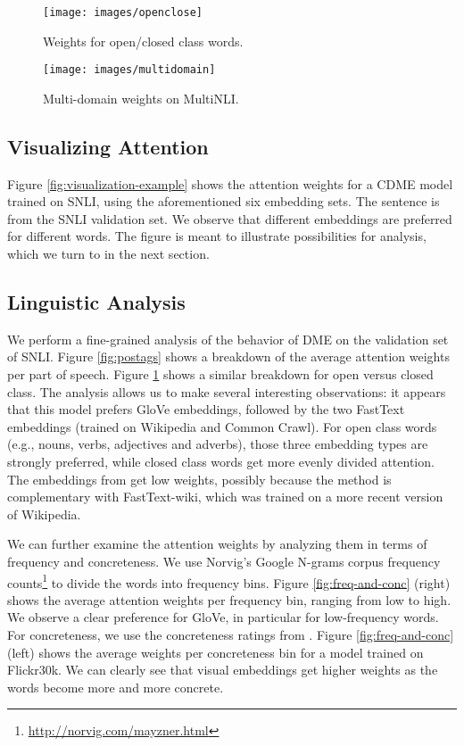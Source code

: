 \documentclass[11pt,a4paper]{article}
\begin{document}
\begin{figure}[t]
\centering
\texttt{[image: images/openclose]}
\caption{Weights for open/closed class words.}
\label{fig:openclose}
\end{figure}

\begin{figure}[t]
\centering
\texttt{[image: images/multidomain]}
\caption{Multi-domain weights on MultiNLI.}
\label{fig:multidomain}
\end{figure}

\subsection{Visualizing Attention}

Figure \ref{fig:visualization-example} shows the attention weights for a CDME model trained on SNLI, using the aforementioned six embedding sets. The sentence is from the SNLI validation set. We observe that different embeddings are preferred for different words. The figure is meant to illustrate possibilities for analysis, which we turn to in the next section.

\subsection{Linguistic Analysis}

We perform a fine-grained analysis of the behavior of DME on the validation set of SNLI. Figure \ref{fig:postags} shows a breakdown of the average attention weights per part of speech. Figure \ref{fig:openclose} shows a similar breakdown for open versus closed class. The analysis allows us to make several interesting observations: it appears that this model prefers GloVe embeddings, followed by the two FastText embeddings (trained on Wikipedia and Common Crawl). For open class words (e.g., nouns, verbs, adjectives and adverbs), those three embedding types are strongly preferred, while closed class words get more evenly divided attention. The embeddings from  get low weights, possibly because the method is complementary with FastText-wiki, which was trained on a more recent version of Wikipedia.

We can further examine the attention weights by analyzing them in terms of frequency and concreteness. We use Norvig's Google N-grams corpus frequency counts\footnote{\url{http://norvig.com/mayzner.html}} to divide the words into frequency bins. Figure \ref{fig:freq-and-conc} (right) shows the average attention weights per frequency bin, ranging from low to high. We observe a clear preference for GloVe, in particular for low-frequency words.  For concreteness, we use the concreteness ratings from . Figure \ref{fig:freq-and-conc} (left) shows the average weights per concreteness bin for a model trained on Flickr30k. We can clearly see that visual embeddings get higher weights as the words become more and more concrete.
\end{document}
